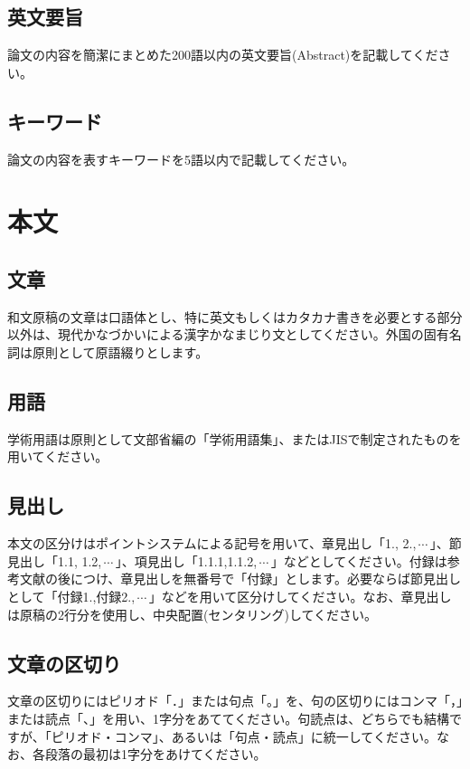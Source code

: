 \documentclass{hissymp}
\begin{document}
\subsection{英文要旨}
論文の内容を簡潔にまとめた200語以内の英文要旨(Abstract)を記載してください。

\subsection{キーワード}
論文の内容を表すキーワードを5語以内で記載してください。


\section{本文}

\subsection{文章}
和文原稿の文章は口語体とし、特に英文もしくはカタカナ書きを必要とする部分以外は、現代かなづかいによる漢字かなまじり文としてください。外国の固有名詞は原則として原語綴りとします。
\subsection{用語}
学術用語は原則として文部省編の「学術用語集」、またはJISで制定されたものを用いてください。
\subsection{見出し}
本文の区分けはポイントシステムによる記号を用いて、章見出し「1., 2.,\,$ \cdots $\,」、節見出し「1.1, 1.2,\,$ \cdots $\,」、項見出し「1.1.1,1.1.2,\,$ \cdots $\,」などとしてください。付録は参考文献の後につけ、章見出しを無番号で「付録」とします。必要ならば節見出しとして「付録1.,付録2.,\,$ \cdots $\,」などを用いて区分けしてください。なお、章見出しは原稿の2行分を使用し、中央配置(センタリング)してください。

\subsection{文章の区切り}
文章の区切りにはピリオド「．」または句点「。」を、句の区切りにはコンマ「，」または読点「、」を用い、1字分をあててください。句読点は、どちらでも結構ですが、「ピリオド・コンマ」、あるいは「句点・読点」に統一してください。なお、各段落の最初は1字分をあけてください。
\end{document}
